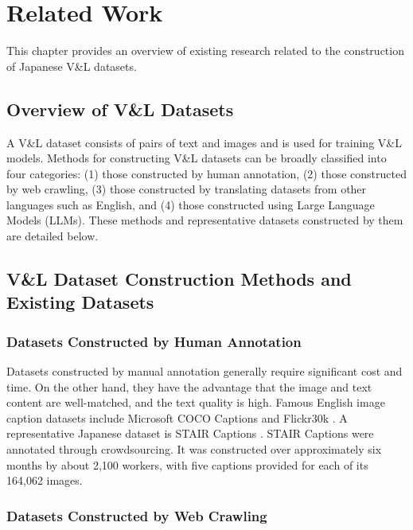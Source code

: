 \documentclass[11pt]{article}
\begin{document}
\section{Related Work}

This chapter provides an overview of existing research related to the construction of Japanese V\&L datasets.

\subsection{Overview of V\&L Datasets}

A V\&L dataset consists of pairs of text and images and is used for training V\&L models. Methods for constructing V\&L datasets can be broadly classified into four categories: (1) those constructed by human annotation, (2) those constructed by web crawling, (3) those constructed by translating datasets from other languages such as English, and (4) those constructed using Large Language Models (LLMs).
These methods and representative datasets constructed by them are detailed below.

\subsection{V\&L Dataset Construction Methods and Existing Datasets}

\subsubsection{Datasets Constructed by Human Annotation}

Datasets constructed by manual annotation generally require significant cost and time. On the other hand, they have the advantage that the image and text content are well-matched, and the text quality is high.
Famous English image caption datasets include Microsoft COCO Captions \cite{lin2014microsoft} and Flickr30k \cite{young2014image}. A representative Japanese dataset is STAIR Captions \cite{Yoshikawa2017}.
STAIR Captions were annotated through crowdsourcing. It was constructed over approximately six months by about 2,100 workers, with five captions provided for each of its 164,062 images.

\subsubsection{Datasets Constructed by Web Crawling}
\end{document}
